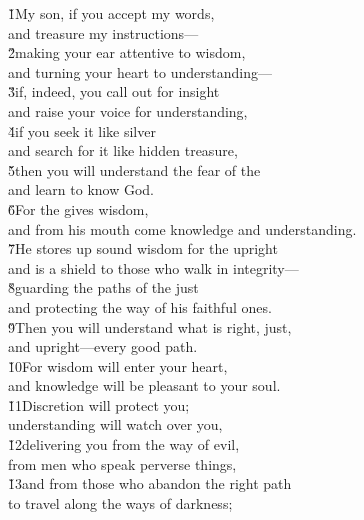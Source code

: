 \begin{poetry}
\poeml {}
\v{1}My son, if you accept my words, \\
\poeml and treasure my instructions--- \\
\poeml \v{2}making your ear attentive to wisdom, \\
\poemll    and turning your heart to understanding--- \\
\poeml \v{3}if, indeed, you call out for insight \\
\poemll    and raise your voice for understanding, \\
\poeml \v{4}if you seek it like silver \\
\poemll    and search for it like hidden treasure, \\
\poeml \v{5}then you will understand the fear of the  \\
\poemll    and learn to know God. \\
\poeml \v{6}For the  gives wisdom, \\
\poemll    and from his mouth come knowledge and understanding. \\
\poeml \v{7}He stores up sound wisdom for the upright \\
\poemll    and is a shield to those who walk in integrity--- \\
\poeml \v{8}guarding the paths of the just \\
\poemll    and protecting the way of his faithful ones. \\
\poeml \v{9}Then you will understand what is right, just, \\
\poemll    and upright---every good path. \\
\poeml \v{10}For wisdom will enter your heart, \\
\poemll    and knowledge will be pleasant to your soul. \\
\poeml \v{11}Discretion will protect you; \\
\poemll    understanding will watch over you, \\
\poeml \v{12}delivering you from the way of evil, \\
\poemll    from men who speak perverse things, \\
\poeml \v{13}and from those who abandon the right path \\
\poemll    to travel along the ways of darkness; \\

\end{poetry}
